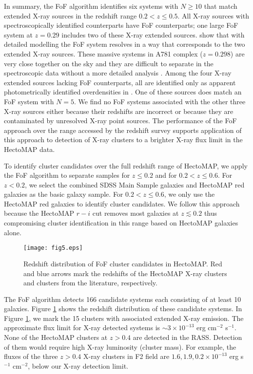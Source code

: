 \documentclass[iop, apj]{emulateapj}
\begin{document}
In summary, 
 the FoF algorithm identifies six systems with $N \geq 10$ 
 that match extended X-ray sources in the redshift range $0.2 < z \leq 0.5$. 
All X-ray sources with spectroscopically identified counterparts have FoF counterparts; 
 one large FoF system at $z = 0.29$ includes two of these X-ray extended sources. 
\citep{Starikova14} show that with detailed modelling the FoF system resolves 
 in a way that corresponds to the two extended X-ray sources.
These massive systems in A781 complex ($z=0.298$) are very close together on the sky and
 they are difficult to separate in the spectroscopic data 
 without a more detailed analysis \citep{Geller10}. 
Among the four X-ray extended sources lacking FoF counterparts, 
 all are identified only as apparent photometrically identified overdensities in \citet{Starikova14}.
One of these sources does match an FoF system with $N = 5$. 
We find no FoF systems associated with the other three X-ray sources 
 either because their redshifts are incorrect or because they are contaminated by unresolved X-ray point sources. 
The performance of the FoF approach 
 over the range accessed by the redshift survey supports 
 application of this approach to detection of X-ray clusters 
 to a brighter X-ray flux limit in the HectoMAP data.

To identify cluster candidates over the full redshift range of HectoMAP, 
 we apply the FoF algorithm to separate samples 
 for $z \leq 0.2$ and for $0.2 < z \leq 0.6$. 
For $z < 0.2$, 
 we select the combined SDSS Main Sample galaxies and HectoMAP red galaxies 
 as the basic galaxy sample. 
For $0.2 < z \leq 0.6$, 
 we only use the HectoMAP red galaxies to identify cluster candidates.
We follow this approach 
 because the HectoMAP $r-i$ cut removes most galaxies at $z \lesssim 0.2$ 
 thus compromising cluster identification 
 in this range based on HectoMAP galaxies alone.
  
\begin{figure}
\centering
\texttt{[image: fig5.eps]}
\caption{
Redshift distribution of FoF cluster candidates in HectoMAP. 
Red and blue arrows mark the redshifts of 
 the HectoMAP X-ray clusters and clusters from the literature, respectively.}
\label{zhist}
\end{figure}
  
The FoF algorithm detects 166 candidate systems each consisting of at least 10 galaxies. 
Figure \ref{zhist} shows the redshift distribution of these candidate systems. 
In Figure \ref{zhist}, 
 we mark the 15 clusters with associated extended X-ray emission. 
The approximate flux limit for X-ray detected systems is $\sim 3 \times 10^{-13}$ erg cm$^{-2}$ s$^{-1}$. 
None of the HectoMAP clusters at $z > 0.4$ are detected in the RASS. 
Detection of them would require high X-ray luminosity (cluster mass).  
For example, 
 the fluxes of the three $z>0.4$ X-ray clusters in F2 field are $1.6, 1.9, 0.2 \times 10^{-13}$ erg s$^{-1}$ cm$^{-2}$, 
 below our X-ray detection limit. 
\end{document}
